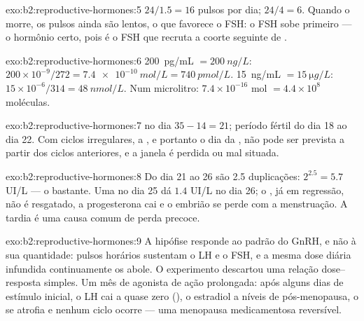 \begin{solution}{exo:b2:reproductive-hormones:5}
$24/1.5 = 16$ pulsos por dia; $24/4 = 6$. Quando o  morre,
os pulsos ainda são lentos, o que favorece o FSH: o FSH sobe primeiro
--- o hormônio certo, pois é o FSH que recruta a coorte seguinte de
.
\end{solution}

\begin{solution}{exo:b2:reproductive-hormones:6}
\qty{200}{pg/mL} $= \qty{200}{ng/L}$: $200\times 10^{-9}/272 =
\qty{7.4e-10}{mol/L} = \qty{740}{pmol/L}$. \qty{15}{ng/mL} $=
\qty{15}{\micro g/L}$: $15\times 10^{-6}/314 = \qty{48}{nmol/L}$. Num
microlitro: $7.4\times 10^{-16}$ mol $= 4.4\times 10^{8}$
moléculas.
\end{solution}

\begin{solution}{exo:b2:reproductive-hormones:7}
 no dia $35 - 14 = 21$; período fértil do dia 18 ao dia 22.
Com ciclos irregulares, a , e portanto o dia da
, não pode ser prevista a partir dos ciclos anteriores, e a
janela é perdida ou mal situada.
\end{solution}

\begin{solution}{exo:b2:reproductive-hormones:8}
Do dia 21 ao 26 são 2.5 duplicações: $2^{2.5} = 5.7$ UI/L --- o
bastante. Uma  no dia 25 dá $1.4$ UI/L no dia 26; o , já em regressão, não é resgatado, a progesterona cai e o
embrião se perde com a menstruação. A  tardia é uma causa
comum de perda precoce.
\end{solution}

\begin{solution}{exo:b2:reproductive-hormones:9}
A hipófise responde ao padrão do GnRH, e não à sua quantidade: pulsos
horários sustentam o LH e o FSH, e a mesma dose diária infundida
continuamente os abole. O experimento descartou uma relação
dose--resposta simples. Um mês de agonista de ação prolongada: após
alguns dias de estímulo inicial, o LH cai a quase zero
(), o estradiol a níveis de
pós-menopausa, o  se atrofia e nenhum ciclo ocorre --- uma
menopausa medicamentosa reversível.
\end{solution}

